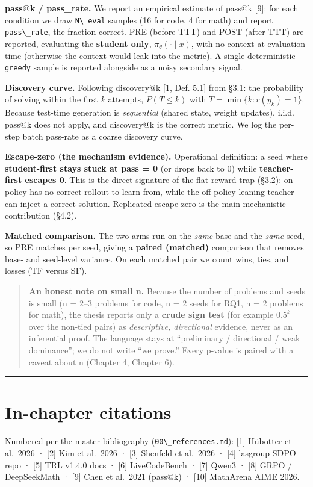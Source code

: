 \textbf{pass@k / pass\_rate.} We report an empirical estimate of pass@k {[}9{]}: for each condition we draw \passthrough{\lstinline!N\_eval!} samples (16 for code, 4 for math) and report \passthrough{\lstinline!pass\_rate!}, the fraction correct. PRE (before TTT) and POST (after TTT) are reported, evaluating the \textbf{student only}, \(\pi_\theta(\cdot\mid x)\), with no context at evaluation time (otherwise the context would leak into the metric). A single deterministic \passthrough{\lstinline!greedy!} sample is reported alongside as a noisy secondary signal.

\textbf{Discovery curve.} Following discovery@k {[}1, Def. 5.1{]} from §3.1: the probability of solving within the first \(k\) attempts, \(P(T \le k)\) with \(T = \min\{k : r(y_k) = 1\}\). Because test-time generation is \emph{sequential} (shared state, weight updates), i.i.d. pass@k does not apply, and discovery@k is the correct metric. We log the per-step batch pass-rate as a coarse discovery curve.

\textbf{Escape-zero (the mechanism evidence).} Operational definition: a seed where \textbf{student-first stays stuck at pass = 0} (or drops back to 0) while \textbf{teacher-first escapes 0}. This is the direct signature of the flat-reward trap (§3.2): on-policy has no correct rollout to learn from, while the off-policy-leaning teacher can inject a correct solution. Replicated escape-zero is the main mechanistic contribution (§4.2).

\textbf{Matched comparison.} The two arms run on the \emph{same} base and the \emph{same} seed, so PRE matches per seed, giving a \textbf{paired (matched)} comparison that removes base- and seed-level variance. On each matched pair we count wins, ties, and losses (TF versus SF).

\begin{quote}
\textbf{An honest note on small n.} Because the number of problems and seeds is small (n = 2--3 problems for code, n = 2 seeds for RQ1, n = 2 problems for math), the thesis reports only a \textbf{crude sign test} (for example \(0.5^k\) over the non-tied pairs) as \emph{descriptive, directional} evidence, never as an inferential proof. The language stays at ``preliminary / directional / weak dominance''; we do not write ``we prove.'' Every p-value is paired with a caveat about n (Chapter 4, Chapter 6).
\end{quote}

\begin{center}\rule{0.5\linewidth}{0.5pt}\end{center}

\section{In-chapter citations}\label{in-chapter-citations}

Numbered per the master bibliography (\passthrough{\lstinline!00\_references.md!}): {[}1{]} Hübotter et al.~2026 · {[}2{]} Kim et al.~2026 · {[}3{]} Shenfeld et al.~2026 · {[}4{]} lasgroup SDPO repo · {[}5{]} TRL v1.4.0 docs · {[}6{]} LiveCodeBench · {[}7{]} Qwen3 · {[}8{]} GRPO / DeepSeekMath · {[}9{]} Chen et al.~2021 (pass@k) · {[}10{]} MathArena AIME 2026.
